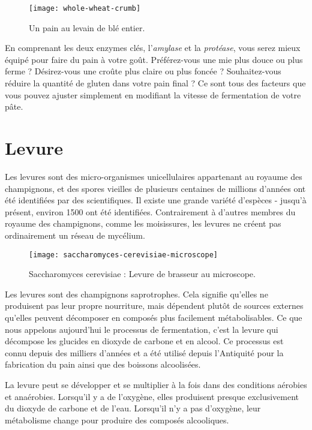 \begin{figure}
  \texttt{[image: whole-wheat-crumb]}
  \caption{Un pain au levain de blé entier.}%
  \label{whole-wheat-crumb}
\end{figure}En comprenant les deux enzymes clés, l'\emph{amylase} et la \emph{protéase}, vous serez mieux équipé pour faire du pain à votre goût. Préférez-vous une mie plus douce ou plus ferme ? Désirez-vous une croûte plus claire ou plus foncée ? Souhaitez-vous réduire la quantité de gluten dans votre pain final ? Ce sont tous des facteurs que vous pouvez ajuster simplement en modifiant la vitesse de fermentation de votre pâte.

\section{Levure}

Les levures sont des micro-organismes unicellulaires appartenant au royaume des champignons, et des spores vieilles de plusieurs centaines de millions d'années ont été identifiées par des scientifiques. Il existe une grande variété d'espèces - jusqu'à présent, environ \num{1500} ont été identifiées. Contrairement à d'autres membres du royaume des champignons, comme les moisissures, les levures ne créent pas ordinairement un réseau de mycélium.

\begin{figure}[!htb]
\begin{center}
  \texttt{[image: saccharomyces-cerevisiae-microscope]}
  \caption[Levure de brasseur]{Saccharomyces cerevisiae : Levure de brasseur au microscope.}%
  \label{saccharomyces-cerevisiae-microscope}
\end{center}
\end{figure}

Les levures sont des champignons saprotrophes. Cela signifie qu'elles ne produisent pas leur propre nourriture, mais dépendent plutôt de sources externes qu'elles peuvent décomposer en composés plus facilement métabolisables. Ce que nous appelons aujourd'hui le processus de fermentation, c'est la levure qui décompose les glucides en dioxyde de carbone et en alcool. Ce processus est connu depuis des milliers d'années et a été utilisé depuis l'Antiquité pour la fabrication du pain ainsi que des boissons alcoolisées.

La levure peut se développer et se multiplier à la fois dans des conditions aérobies et anaérobies. Lorsqu'il y a de l'oxygène, elles produisent presque exclusivement du dioxyde de carbone et de l'eau. Lorsqu'il n'y a pas d'oxygène, leur métabolisme change pour produire des composés alcooliques.

